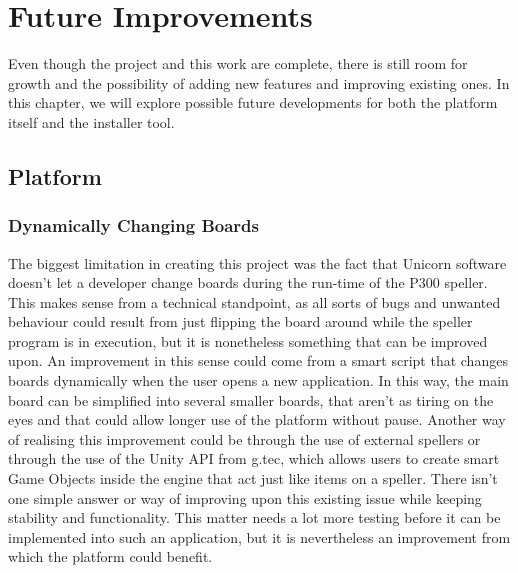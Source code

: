 
\chapter{Future Improvements}\label{cap:future}
Even though the project and this work are complete, there is still room for growth and the possibility of adding new features and improving existing ones. In this chapter, we will explore possible future developments for both the platform itself and the installer tool.

\section{Platform}
\subsection{Dynamically Changing Boards}
The biggest limitation in creating this project was the fact that Unicorn software doesn't let a developer change boards during the run-time of the P300 speller. This makes sense from a technical standpoint, as all sorts of bugs and unwanted behaviour could result from just flipping the board around while the speller program is in execution, but it is nonetheless something that can be improved upon.
\vspace{\baselineskip}\newline
An improvement in this sense could come from a smart script that changes boards dynamically when the user opens a new application. In this way, the main board can be simplified into several smaller boards, that aren't as tiring on the eyes and that could allow longer use of the platform without pause. Another way of realising this improvement could be through the use of external spellers or through the use of the Unity API from g.tec, which allows users to create smart Game Objects inside the engine that act just like items on a speller. 
\vspace{\baselineskip}\newline
There isn't one simple answer or way of improving upon this existing issue while keeping stability and functionality. This matter needs a lot more testing before it can be implemented into such an application, but it is nevertheless an improvement from which the platform could benefit.

